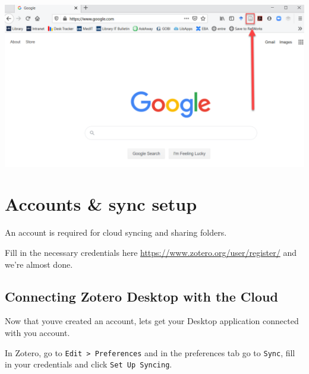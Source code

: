 \documentclass[
]{book}
\begin{document}
\includegraphics{images/Z_PluginSuccess.png}

\hypertarget{accounts-sync-setup}{%
\section{Accounts \& sync setup}\label{accounts-sync-setup}}

An account is required for cloud syncing and sharing folders.

Fill in the necessary credentials here \url{https://www.zotero.org/user/register/} and we're almost done.

\hypertarget{connecting-zotero-desktop-with-the-cloud}{%
\subsection*{Connecting Zotero Desktop with the Cloud}\label{connecting-zotero-desktop-with-the-cloud}}

Now that you\textquotesingle ve created an account, let\textquotesingle s get your Desktop application connected with you account.

In Zotero, go to \texttt{Edit\ \textgreater{}\ Preferences} and in the preferences tab go to \texttt{Sync}, fill in your credentials and click \texttt{Set\ Up\ Syncing}.
\end{document}
